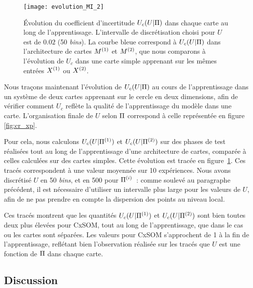 \documentclass[../main]{subfiles}
\begin{document}
\begin{figure}
    \centering\texttt{[image: evolution\_MI\_2]}
    \caption{\'Evolution du coefficient d'incertitude $U_c(U|\Pi)$ dans chaque carte au long de l'apprentissage. L'intervalle de discrétisation choisi pour $U$ est de $0.02$ (50 \emph{bins}).
    La courbe bleue correspond à $U_c(U|\Pi)$ dans l'architecture de cartes $M^{({1})}$ et $M^{({2})}$, que nous comparons à l'évolution de $U_c$ dans une carte simple apprenant sur les mêmes entrées $X^{({1})}$ ou $X^{({2})}$.}
    \label{fig:MI_evol}
    \end{figure}

Nous traçons maintenant l'évolution de $U_c(U|\Pi)$ au cours de l'apprentissage dans un système de deux cartes apprenant sur le cercle en deux dimensions, afin de vérifier comment $U_c$ reflète la qualité de l'apprentissage du modèle dans une carte. L'organisation finale de $U$ selon $\Pi$ correspond à celle représentée en figure \ref{fig:cr_xp}.

Pour cela, nous calculons $U_c(U|\Pi^{({1})})$ et $U_c(U|\Pi^{({2})})$ sur des phases de test réalisées tout au long de l'apprentissage d'une architecture de cartes, comparée à celles calculées sur des cartes simples.
Cette évolution est tracée en figure~\ref{fig:MI_evol}. Ces tracés correspondent à une valeur moyennée sur 10 expériences.
Nous avons discrétisé $U$ en 50 \emph{bins}, et en 500 pour $\Pi^{({i})}$~: comme soulevé au paragraphe précédent, il est nécessaire d'utiliser un intervalle plus large pour les valeurs de $U$, afin de ne pas prendre en compte la dispersion des points au niveau local.

Ces tracés montrent que les quantités $U_c(U|\Pi^{({1})})$ et $U_c(U|\Pi^{({2})})$ sont bien toutes deux plus élevées pour CxSOM, tout au long de l'apprentissage, que dans le cas ou les cartes sont séparées. Les valeurs pour CxSOM s'approchent de 1 à la fin de l'apprentissage, reflétant bien l'observation réalisée sur les tracés que $U$ est une fonction de $\Pi$ dans chaque carte.

\subsection{Discussion}
\end{document}
